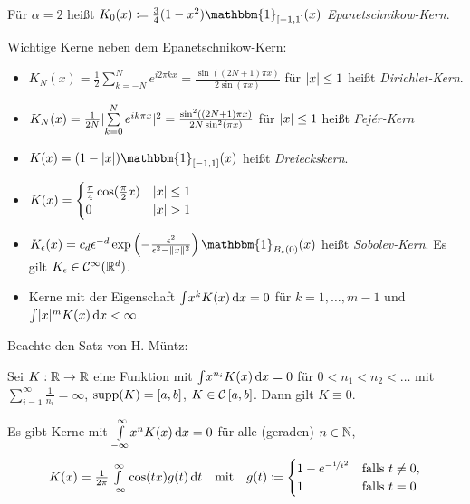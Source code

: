 \documentclass{cheat-sheet}
\newcommand{\ind}{\mathbbm{1}} %
\newcommand{\Cont}{\mathcal{C}} %
\begin{document}
\begin{defn}
  Für $\alpha = 2$ heißt $K_0(x) \coloneqq \tfrac{3}{4} (1 - x^2) \ind_{\cinterval{-1}{1}} (x)$ \emph{Epanetschnikow-Kern}.
\end{defn}


\begin{bem}
  Wichtige Kerne neben dem Epanetschnikow-Kern:
  \begin{itemize}
    \item $K_N(x) = \tfrac{1}{2} \sum_{k=-N}^N e^{i 2 \pi k x} = \tfrac{\sin((2 N + 1) \pi x)}{2 \sin (\pi x)}$ für $\lvert x\rvert \leq 1$ heißt \emph{Dirichlet-Kern}.
    \item $K_N(x) = \tfrac{1}{2 N} \abs{\sum_{k=0}^N e^{i k \pi x}}^2 = \tfrac{\sin^2((2 N + 1) \pi x)}{2 N \sin^2(\pi x)}$ für $\lvert x\rvert \leq 1$ heißt \emph{Fejér-Kern}
    \item $K(x) = (1 - \abs{x}) \ind_{\cinterval{-1}{1}}(x)$ heißt \emph{Dreieckskern}.
    \item $K(x) = \begin{cases}
      \tfrac{\pi}{4} \cos(\tfrac{\pi}{2} x) & \lvert x\rvert \leq 1 \\
      0 & \lvert x\rvert > 1
    \end{cases}$
    \item $K_\epsilon(x) = c_d \epsilon^{-d} \exp \left( - \tfrac{\epsilon^2}{\epsilon^2 - \norm{x}^2} \right) \ind_{B_\epsilon(0)}(x)$ heißt \emph{Sobolev-Kern}.
    Es gilt $K_\epsilon \in \Cont^\infty(\R^d)$.
    \item Kerne mit der Eigenschaft ${\textstyle \int} x^k K(x) \,\mathrm{d} x = 0$ für $k = 1, \ldots, m - 1$ und ${\textstyle \int} \lvert x\rvert^m K(x) \,\mathrm{d} x < \infty$.
  \end{itemize}
\end{bem}

\begin{bem}
  Beachte den Satz von H. Müntz:

  Sei $K : \mathbb{R} \to \mathbb{R}$ eine Funktion mit ${\textstyle \int} x^{n_i} K(x) \,\mathrm{d} x = 0$ für $0 < n_1 < n_2 < \ldots$ mit $\sum_{i=1}^\infty \tfrac{1}{n_i} = \infty$, $\operatorname{supp}(K) = \left[ a, b \right]$, $K \in \Cont \cinterval{a}{b}$. Dann gilt $K \equiv 0$.
\end{bem}

\begin{bem}
  Es gibt Kerne mit ${\textstyle \int\limits_{-\infty}^{\infty}} x^n K(x) \,\mathrm{d} x = 0$ für alle (geraden) $n \in \mathbb{N}$, \zB{}
  \[
    K(x) = \tfrac{1}{2 \pi} {\textstyle \int\limits_{- \infty}^{\infty}} \cos(t x) g(t) \,\mathrm{d} t
    \quad \text{mit} \quad
    g(t) \coloneqq \begin{cases}
      1 - e^{- \nicefrac{1}{t^2}} & \text{falls } t \neq 0, \\
      1 & \text{falls } t = 0
    \end{cases}
  \]
\end{bem}
\end{document}
